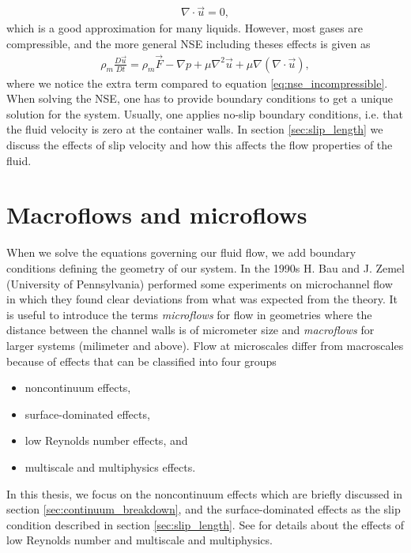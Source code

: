 \begin{align}
	\nabla\cdot \vec u = 0,
\end{align}
which is a good approximation for many liquids. However, most gases are compressible, and the more general NSE including theses effects is given as
\begin{align}
	\rho_m \frac{D\vec u}{ Dt} = \rho_m \vec F - \nabla p + \mu\nabla^2\vec u + \mu\nabla(\nabla\cdot \vec u),
\end{align}
where we notice the extra term compared to equation \eqref{eq:nse_incompressible}. When solving the NSE, one has to provide boundary conditions to get a unique solution for the system. Usually, one applies no-slip boundary conditions, i.e. that the fluid velocity is zero at the container walls. In section \ref{sec:slip_length} we discuss the effects of slip velocity and how this affects the flow properties of the fluid. 
\section{Macroflows and microflows}
When we solve the equations governing our fluid flow, we add boundary conditions defining the geometry of our system. In the 1990s H. Bau and J. Zemel (University of Pennsylvania) performed some experiments on microchannel flow in which they found clear deviations from what was expected from the theory\cite{karniadakis2005microflows}. It is useful to introduce the terms \textit{microflows} for flow in geometries where the distance between the channel walls is of micrometer size and \textit{macroflows} for larger systems (milimeter and above). Flow at microscales differ from macroscales because of effects that can be classified into four groups
\begin{itemize}
\item noncontinuum effects,
\item surface-dominated effects,
\item low Reynolds number effects, and
\item multiscale and multiphysics effects.
\end{itemize}
In this thesis, we focus on the noncontinuum effects which are briefly discussed in section \ref{sec:continuum_breakdown}, and the surface-dominated effects as the slip condition described in section \ref{sec:slip_length}. See \cite{karniadakis2005microflows} for details about the effects of low Reynolds number and multiscale and multiphysics. 
